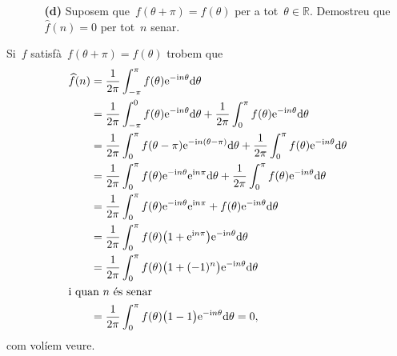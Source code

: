 \documentclass[a4paper]{article}
\newcommand{\iu}{\mathrm{i}}
\newcommand{\e}{\mathrm{e}}
\newcommand{\uppi}{\pi}
\newcommand{\diff}{\mathrm{d}}
\begin{document}
\begin{enumerate}
    \item[]\begin{enumerate}
        \item[\textbf{(d)}] Suposem que~\(f(\theta + \uppi) = f(\theta)\) per a
            tot~\(\theta\in\mathbb{R}\). Demostreu que~\(\widehat{f}(n) = 0\)
            per tot~\(n\) senar.
    \end{enumerate}
\end{enumerate}
Si~\(f\) satisfà~\(f(\theta + \uppi) = f(\theta)\) trobem que
\begin{align*}
    \widehat{f}(n) &= \frac{1}{2\uppi}
                      \int_{-\uppi}^{\uppi} f(\theta)\e^{-\iu n\theta}\diff
                      \theta \\
                   &= \frac{1}{2\uppi}
                      \int_{-\uppi}^{0} f(\theta)\e^{-\iu n\theta}\diff
                      \theta + \frac{1}{2\uppi}
                      \int_{0}^{\uppi} f(\theta)\e^{-\iu n\theta}\diff
                      \theta \\
                   &= \frac{1}{2\uppi}
                      \int_{0}^{\uppi} f(\theta-\uppi)
                      \e^{-\iu n(\theta-\uppi)}\diff
                      \theta + \frac{1}{2\uppi}
                      \int_{0}^{\uppi} f(\theta)\e^{-\iu n\theta}\diff
                      \theta \\
                   &= \frac{1}{2\uppi}
                      \int_{0}^{\uppi} f(\theta)
                      \e^{-\iu n\theta}
                      \e^{\iu n\uppi}
                      \diff\theta + \frac{1}{2\uppi}
                      \int_{0}^{\uppi} f(\theta)\e^{-\iu n\theta}\diff
                      \theta \\
                   &= \frac{1}{2\uppi}
                      \int_{0}^{\uppi}
                      f(\theta)
                      \e^{-\iu n\theta}
                      \e^{\iu n\uppi}
                      + f(\theta)\e^{-\iu n\theta}\diff
                      \theta \\
                   &= \frac{1}{2\uppi}
                      \int_{0}^{\uppi}
                      f(\theta)\bigl(1 + \e^{\iu n\uppi}\bigr)
                      \e^{-\iu n\theta}
                      \diff\theta \\
                   &= \frac{1}{2\uppi}
                      \int_{0}^{\uppi}
                      f(\theta)\bigl(1 + (-1)^{n}\bigr)
                      \e^{-\iu n\theta}
                      \diff\theta \\
                      \intertext{i quan~\(n\) és senar}
                   &= \frac{1}{2\uppi}
                      \int_{0}^{\uppi}
                      f(\theta)\bigl(1 - 1\bigr)
                      \e^{-\iu n\theta}
                      \diff\theta = 0,
\end{align*}
com volíem veure.
\end{document}
